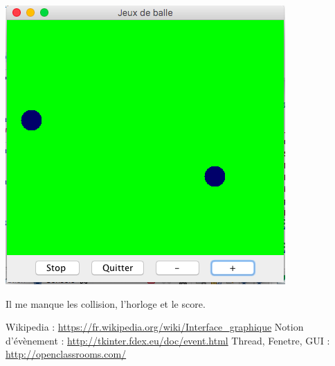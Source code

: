 \documentclass{article}
\begin{document}
\begin{center}
  \includegraphics[scale=0.5]{balle.png}
\end{center}


Il me manque les collision, l'horloge et le score.




\begin{thebibliography}{9}
         Wikipedia : \url {https://fr.wikipedia.org/wiki/Interface_graphique}
         Notion d'évènement : \url {http://tkinter.fdex.eu/doc/event.html}
	Thread, Fenetre, GUI : \url{http://openclassrooms.com/}
\end{thebibliography}

	
	
\end{document}
